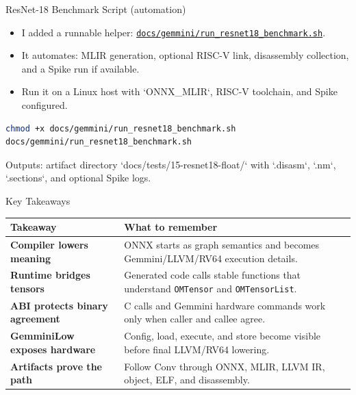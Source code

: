 \documentclass[aspectratio=169,10pt]{beamer}
\newcommand{\code}[1]{\texttt{\footnotesize #1}}
\newcommand{\repoRoot}{/home/lahcen/toolchains/onnx-mlir-xcompile/onnx-mlir}
\newcommand{\pathcode}[1]{\href{run:\repoRoot/#1}{\texttt{\scriptsize #1}}}
\newcommand{\edgeword}[1]{\textcolor{red!75!black}{\textbf{#1}}}
\begin{document}
\begin{frame}{ResNet-18 Benchmark Script (automation)}
  \begin{itemize}
    \item I added a runnable helper: \pathcode{docs/gemmini/run_resnet18_benchmark.sh}.
    \item It automates: MLIR generation, optional RISC-V link, disassembly collection, and a Spike run if available.
    \item Run it on a Linux host with `ONNX_MLIR`, RISC-V toolchain, and Spike configured.
  \end{itemize}
  \vspace{0.4em}
  \scriptsize
  \begin{lstlisting}[language=bash]
chmod +x docs/gemmini/run_resnet18_benchmark.sh
docs/gemmini/run_resnet18_benchmark.sh
  \end{lstlisting}
  \vspace{0.4em}
  Outputs: artifact directory `docs/tests/15-resnet18-float/` with `.disasm`, `.nm`, `.sections`, and optional Spike logs.
\end{frame}

\begin{frame}{Key Takeaways}
  \scriptsize
  \begin{tabularx}{\textwidth}{@{}lX@{}}
    \toprule
    Takeaway & What to remember \\
    \midrule
    \edgeword{Compiler lowers meaning} &
      ONNX starts as graph semantics and becomes Gemmini/LLVM/RV64 execution details. \\
    \edgeword{Runtime bridges tensors} &
      Generated code calls stable functions that understand \code{OMTensor} and \code{OMTensorList}. \\
    \edgeword{ABI protects binary agreement} &
      C calls and Gemmini hardware commands work only when caller and callee agree. \\
    \edgeword{GemminiLow exposes hardware} &
      Config, load, execute, and store become visible before final LLVM/RV64 lowering. \\
    \edgeword{Artifacts prove the path} &
      Follow Conv through ONNX, MLIR, LLVM IR, object, ELF, and disassembly. \\
    \bottomrule
  \end{tabularx}
\end{frame}
\end{document}
